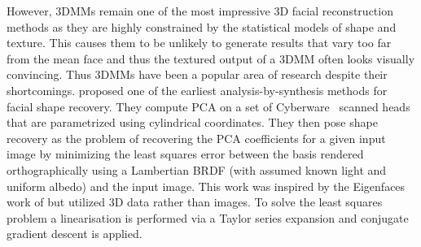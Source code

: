 However, 3DMMs remain one of the most impressive 3D facial reconstruction
methods as they are highly constrained by the statistical models
of shape and texture. This causes them to be unlikely to generate results
that vary too far from the mean face and thus the textured output of a 3DMM
often looks visually convincing. Thus 3DMMs have been a popular area of
research despite their shortcomings.
\cite{atick1996statistical} proposed one of the earliest analysis-by-synthesis
methods for facial shape recovery. They compute PCA on a set of
Cyberware~\cite{cyberware} scanned heads that are parametrized using
cylindrical coordinates. They then pose shape recovery as the problem
of recovering the PCA coefficients for a given input image by minimizing
the least squares error between the basis rendered orthographically
using a Lambertian BRDF (with assumed known light and uniform albedo)
and the input image. This work was inspired by the Eigenfaces work of
\citet{Sirovich:1987te} but utilized 3D data rather than images. To solve
the least squares problem a linearisation is performed via a Taylor series 
expansion and conjugate gradient descent is applied.
